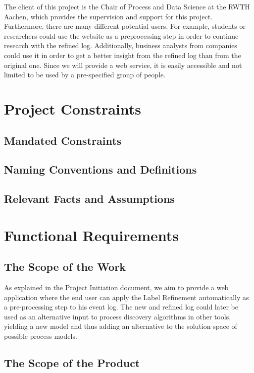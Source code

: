 \documentclass[notitlepage]{article}
\begin{document}
\begin{flushleft}
The client of this project is the Chair of Process and Data Science at the RWTH Aachen, which provides the supervision and support for this project. Furthermore, there are many different potential users. For example, students or researchers could use the website as a preprocessing step in order to continue research with the refined log. Additionally, business analysts from companies could use it in order to get a better insight from the refined log than from the original one. Since we will provide a web service, it is easily accessible and not limited to be used by a pre-specified group of people. 

\section{Project Constraints}

\subsection{Mandated Constraints}

\subsection{Naming Conventions and Definitions}

\subsection{Relevant Facts and Assumptions}


\section{Functional Requirements}

\subsection{The Scope of the Work}
As explained in the Project Initiation document, we aim to provide a web application where the end user can apply the Label Refinement automatically as a pre-processing step to his event log.
The new and refined log could later be used as an alternative input to process discovery algorithms in other tools, yielding a new model and thus adding an alternative to the solution space of possible process models.


\subsection{The Scope of the Product}


\end{flushleft}
\end{document}
